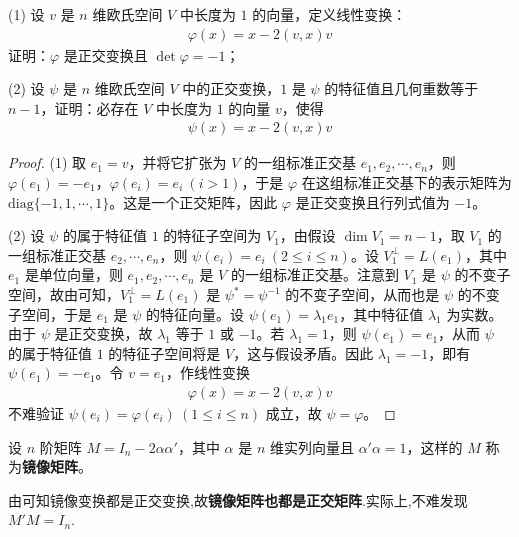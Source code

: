 \documentclass[../../main.tex]{subfiles}%
\begin{document}
\begin{proposition}[镜像变换的基本性质]\label{proposition:例9.40}
(1) 设 \(v\) 是 \(n\) 维欧氏空间 \(V\) 中长度为 \(1\) 的向量，定义线性变换：
\begin{align*}
\varphi(x) = x - 2(v,x)v
\end{align*}
证明：\(\varphi\) 是正交变换且 \(\det\varphi = -1\)；

(2) 设 \(\psi\) 是 \(n\) 维欧氏空间 \(V\) 中的正交变换，\(1\) 是 \(\psi\) 的特征值且几何重数等于 \(n - 1\)，证明：必存在 \(V\) 中长度为 \(1\) 的向量 \(v\)，使得
\begin{align*}
\psi(x) = x - 2(v,x)v
\end{align*}
\end{proposition}
\begin{proof}

(1) 取 \(e_1 = v\)，并将它扩张为 \(V\) 的一组标准正交基 \(e_1,e_2,\cdots,e_n\)，则 \(\varphi(e_1) = -e_1\)，\(\varphi(e_i) = e_i\ (i > 1)\)，于是 \(\varphi\) 在这组标准正交基下的表示矩阵为 \(\mathrm{diag}\{-1,1,\cdots,1\}\)。这是一个正交矩阵，因此 \(\varphi\) 是正交变换且行列式值为 \(-1\)。

(2) 设 \(\psi\) 的属于特征值 \(1\) 的特征子空间为 \(V_1\)，由假设 \(\dim V_1 = n - 1\)，取 \(V_1\) 的一组标准正交基 \(e_2,\cdots,e_n\)，则 \(\psi(e_i) = e_i\ (2\leqslant  i \leqslant  n)\)。设 \(V_1^{\perp} = L(e_1)\)，其中 \(e_1\) 是单位向量，则 \(e_1,e_2,\cdots,e_n\) 是 \(V\) 的一组标准正交基。注意到 \(V_1\) 是 \(\psi\) 的不变子空间，故由可知，\(V_1^{\perp} = L(e_1)\) 是 \(\psi^* = \psi^{-1}\) 的不变子空间，从而也是 \(\psi\) 的不变子空间，于是 \(e_1\) 是 \(\psi\) 的特征向量。设 \(\psi(e_1) = \lambda_1e_1\)，其中特征值 \(\lambda_1\) 为实数。由于 \(\psi\) 是正交变换，故 \(\lambda_1\) 等于 \(1\) 或 \(-1\)。若 \(\lambda_1 = 1\)，则 \(\psi(e_1) = e_1\)，从而 \(\psi\) 的属于特征值 \(1\) 的特征子空间将是 \(V\)，这与假设矛盾。因此 \(\lambda_1 = -1\)，即有 \(\psi(e_1) = -e_1\)。令 \(v = e_1\)，作线性变换
\begin{align*}
\varphi(x) = x - 2(v,x)v
\end{align*}
不难验证 \(\psi(e_i) = \varphi(e_i)\ (1\leqslant  i \leqslant  n)\) 成立，故 \(\psi = \varphi\)。

\end{proof}

\begin{definition}[镜像矩阵]
设 \(n\) 阶矩阵 \(M = I_n - 2\alpha\alpha'\)，其中 \(\alpha\) 是 \(n\) 维实列向量且 \(\alpha'\alpha = 1\)，这样的 \(M\) 称为\textbf{镜像矩阵}。
\end{definition}
\begin{remark}
由可知镜像变换都是正交变换,故\textbf{镜像矩阵也都是正交矩阵}.实际上,不难发现$M'M=I_n$.
\end{remark}
\end{document}

